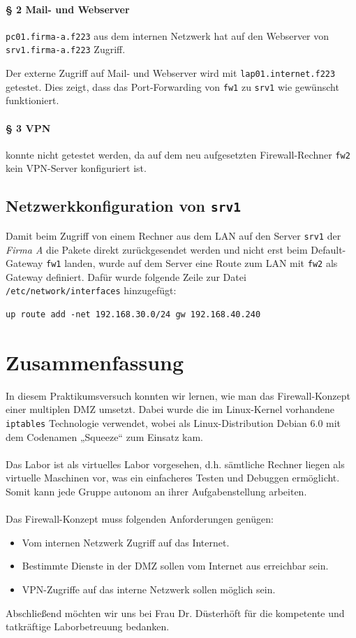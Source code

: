 \paragraph{§ 2 Mail- und Webserver}

{\tt pc01.firma-a.f223} aus dem internen Netzwerk hat auf
den Webserver von {\tt srv1.firma-a.f223} Zugriff.

Der externe Zugriff auf Mail- und Webserver wird mit {\tt lap01.internet.f223}
getestet.
Dies zeigt, dass das Port-Forwarding von {\tt fw1} zu {\tt srv1}
wie gewünscht funktioniert.

\paragraph{§ 3 VPN}
konnte nicht getestet werden, da auf dem neu aufgesetzten Firewall-Rechner
{\tt fw2} kein VPN-Server konfiguriert ist.


\subsection{Netzwerkkonfiguration von {\tt srv1}}

Damit beim Zugriff von einem Rechner aus dem LAN auf den Server
{\tt srv1} der \emph{Firma A} die Pakete direkt zurückgesendet werden und nicht
erst beim Default-Gateway {\tt fw1} landen, wurde auf dem
Server eine Route zum LAN mit {\tt fw2} als Gateway definiert.
Dafür wurde folgende Zeile zur Datei {\tt /etc/network/interfaces} hinzugefügt:
\begin{verbatim}
up route add -net 192.168.30.0/24 gw 192.168.40.240
\end{verbatim}


\newpage
\section{Zusammenfassung}

In diesem Praktikumsversuch konnten wir lernen, wie man das Firewall-Konzept
einer multiplen DMZ umsetzt. Dabei wurde die im Linux-Kernel vorhandene
{\tt iptables} Technologie verwendet, wobei als Linux-Distribution Debian 6.0
mit dem Codenamen „Squeeze“ zum Einsatz kam.
\\ \\
\noindent Das Labor ist als virtuelles Labor vorgesehen, d.h. sämtliche Rechner liegen
als virtuelle Maschinen vor, was ein einfacheres Testen und Debuggen ermöglicht.
Somit kann jede Gruppe autonom an ihrer Aufgabenstellung arbeiten.
\\ \\
\noindent Das Firewall-Konzept muss folgenden Anforderungen genügen:

\begin{itemize}
  \item Vom internen Netzwerk Zugriff auf das Internet.
  \item Bestimmte Dienste in der DMZ sollen vom Internet aus erreichbar sein.
  \item VPN-Zugriffe auf das interne Netzwerk sollen möglich sein.
\end{itemize}

\noindent Abschließend möchten wir uns bei Frau Dr. Düsterhöft für die
kompetente und tatkräftige Laborbetreuung bedanken.
